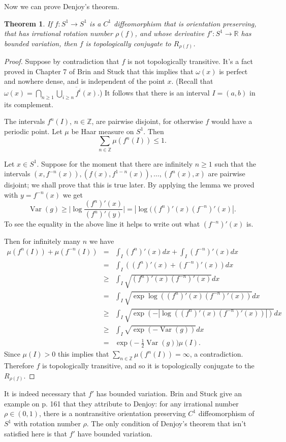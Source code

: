 \documentclass{article}
\newtheorem{theorem}{Theorem}
\newcommand{\Var}[0]{\operatorname{Var}}
\theoremstyle{definition}
\begin{document}
Now we can prove Denjoy's theorem.

\begin{theorem}
If $f:S^1 \to S^1$ is a $C^1$ diffeomorphism that is orientation preserving, that has irrational rotation
number $\rho(f)$, and whose derivative $f':S^1 \to \mathbb{R}$ has bounded variation, then $f$ is topologically
conjugate to $R_{\rho(f)}$.
\end{theorem}
\begin{proof}
Suppose by contradiction that $f$ is not topologically transitive. It's a fact proved in Chapter 7
of Brin and Stuck that this implies that $\omega(x)$ is perfect and nowhere dense, and is independent
of the point $x$. (Recall that $\omega(x)=\bigcap_{n \geq 1} \overline{\bigcup_{i \geq n} f^i(x)}$.)
It follows that
 there is an interval $I=(a,b)$
in its complement.

The intervals $f^n(I)$, $n \in \mathbb{Z}$, are pairwise disjoint, for otherwise
$f$ would have a periodic point. Let $\mu$ be Haar measure on $S^1$. Then
\[
\sum_{n \in \mathbb{Z}} \mu(f^n(I)) \leq 1.
\]

Let $x \in S^1$. Suppose for the moment that there are infinitely $n \geq 1$ such that
the intervals $(x,f^{-n}(x)), (f(x),f^{1-n}(x)),\ldots, (f^n(x),x)$ are pairwise disjoint;
we shall prove that this is true later.
By applying the lemma we proved with
$y=f^{-n}(x)$ we get 
\[
\Var(g) \geq \Big| \log \frac{(f^n)'(x)}{(f^n)'(y)} \Big|=
|\log((f^n)'(x) (f^{-n})'(x)|. 
\]
To see the equality in the above line it helps to write out what $(f^{-n})'(x)$ is.

Then for infinitely many $n$ we have
\begin{eqnarray*}
\mu(f^n(I))+\mu(f^{-n}(I))&=&\int_I (f^n)'(x) dx +\int_I (f^{-n})'(x) dx\\
&=&\int_I ((f^n)'(x)+(f^{-n})'(x)) dx\\
&\geq&\int_I \sqrt{(f^n)'(x) (f^{-n})'(x)}dx\\
&=&\int_I \sqrt{\exp \log((f^n)'(x) (f^{-n})'(x))} dx\\
&\geq&\int_I \sqrt{\exp(-| \log((f^n)'(x) (f^{-n})'(x)) |)} dx\\
&\geq&\int_I \sqrt{\exp(-\Var(g))} dx\\
&=&\exp\Big( -\frac{1}{2}\Var(g) \Big) \mu(I).
\end{eqnarray*}
Since $\mu(I)>0$ this implies that $\sum_{n \in \mathbb{Z}} \mu(f^n(I))=\infty$, a contradiction. Therefore
$f$ is topologically transitive, and so it is topologically conjugate
to the $R_{\rho(f)}$.
\end{proof}

It is indeed necessary that $f'$ has bounded variation. Brin and Stuck give an example on p. 161 that they attribute to Denjoy: for any irrational number $\rho \in (0,1)$, there is a nontransitive orientation preserving $C^1$
diffeomorphism of $S^1$ with rotation number $\rho$. The only condition of Denjoy's theorem that isn't
satisfied here is that $f'$ have bounded variation.
\end{document}
